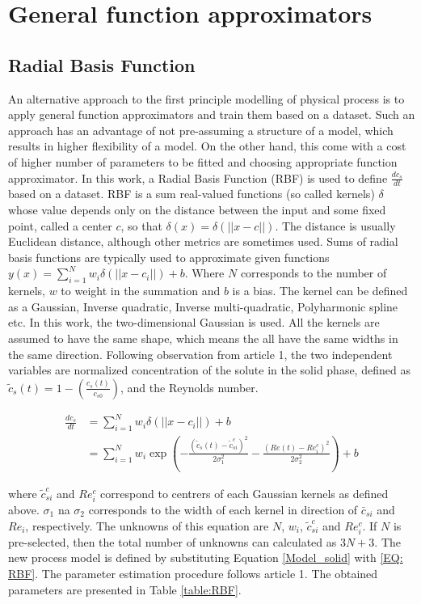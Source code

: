 \documentclass[../Article_Model_Parameters.tex]{subfiles}
\begin{document}
	
	\section{General function approximators} \label{CH: RBF}
	
	\subsection{Radial Basis Function}
	
	An alternative approach to the first principle modelling of physical process is to apply general function approximators and train them based on a dataset. Such an approach has an advantage of not pre-assuming a structure of a model, which results in higher flexibility of a model. On the other hand, this come with a cost of higher number of parameters to be fitted and choosing appropriate function approximator. In this work, a Radial Basis Function (RBF) is used to define $\frac{dc_s}{dt}$ based on a dataset. RBF is a sum real-valued functions (so called kernels) $\delta$ whose value depends only on the distance between the input and some fixed point, called a center $c$, so that $\delta(x) = \delta(||x-c||)$. The distance is usually Euclidean distance, although other metrics are sometimes used. Sums of radial basis functions are typically used to approximate given functions $y(x) = \sum_{i=1}^{N} w_i \delta(||x-c_i||) + b$. Where $N$ corresponds to the number of kernels, $w$ to weight in the summation and $b$ is a bias. The kernel can be defined as a Gaussian, Inverse quadratic, Inverse multi-quadratic, Polyharmonic spline etc. In this work, the two-dimensional Gaussian is used. All the kernels are assumed to have the same shape, which means the all have the same widths in the same direction.
	Following observation from {\color{red}article 1}, the two independent variables are normalized concentration of the solute in the solid phase, defined as $\tilde{c}_s(t) = 1 - \left(\frac{c_s(t)}{c_{s0}}\right)$, and the Reynolds number.
	
	{\footnotesize
		\begin{align} %
			\frac{dc_s}{dt} &= \sum_{i=1}^{N} w_i \delta(||x-c_i||) + b \\ \nonumber
			&= \sum_{i=1}^{N} w_i \exp \left( - \frac{ \left( \tilde{c}_s(t)-\tilde{c}_{si}^c \right)^2 }{2\sigma_1^2} - \frac{ \left( Re(t)-Re_i^c \right)^2 }{2\sigma_2^2} \right) + b \label{EQ: RBF}
		\end{align}
	}
	
	where $\tilde{c}_{si}^c$ and $Re_i^c$ correspond to centrers of each Gaussian kernels as defined above. $\sigma_1$ na $\sigma_2$ corresponds to the width of each kernel in direction of $\bar{c}_{si}$ and $Re_i$, respectively. The unknowns of this equation are $N$, $w_i$, $\tilde{c}_{si}^c$ and $Re_i^c$. If $N$ is pre-selected, then the total number of unknowns can calculated as $3N+3$. The new process model is defined by substituting Equation \ref{Model_solid} with \ref{EQ: RBF}. The parameter estimation procedure follows {\color{red}article 1}. The obtained parameters are presented in Table \ref{table:RBF}.
	
\end{document}

